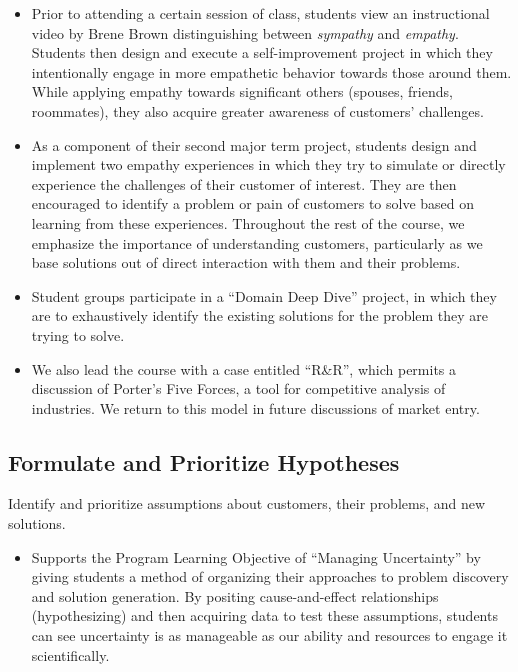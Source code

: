 \documentclass[11pt,article,oneside]{memoir}
\begin{document}
\begin{itemize}
\tightlist
\item
  Prior to attending a certain session of class, students view an
  instructional video by Brene Brown distinguishing between
  \emph{sympathy} and \emph{empathy}. Students then design and execute a
  self-improvement project in which they intentionally engage in more
  empathetic behavior towards those around them. While applying empathy
  towards significant others (spouses, friends, roommates), they also
  acquire greater awareness of customers' challenges.
\item
  As a component of their second major term project, students design and
  implement two empathy experiences in which they try to simulate or
  directly experience the challenges of their customer of interest. They
  are then encouraged to identify a problem or pain of customers to
  solve based on learning from these experiences. Throughout the rest of
  the course, we emphasize the importance of understanding customers,
  particularly as we base solutions out of direct interaction with them
  and their problems.
\item
  Student groups participate in a \enquote{Domain Deep Dive} project, in
  which they are to exhaustively identify the existing solutions for the
  problem they are trying to solve.
\item
  We also lead the course with a case entitled \enquote{R\&R}, which
  permits a discussion of Porter's Five Forces, a tool for competitive
  analysis of industries. We return to this model in future discussions
  of market entry.
\end{itemize}

\subsection{Formulate and Prioritize
Hypotheses}\label{formulate-and-prioritize-hypotheses}

Identify and prioritize assumptions about customers, their problems, and
new solutions.

\begin{itemize}
\tightlist
\item
  Supports the Program Learning Objective of \enquote{Managing
  Uncertainty} by giving students a method of organizing their
  approaches to problem discovery and solution generation. By positing
  cause-and-effect relationships (hypothesizing) and then acquiring data
  to test these assumptions, students can see uncertainty is as
  manageable as our ability and resources to engage it scientifically.
\end{itemize}
\end{document}
